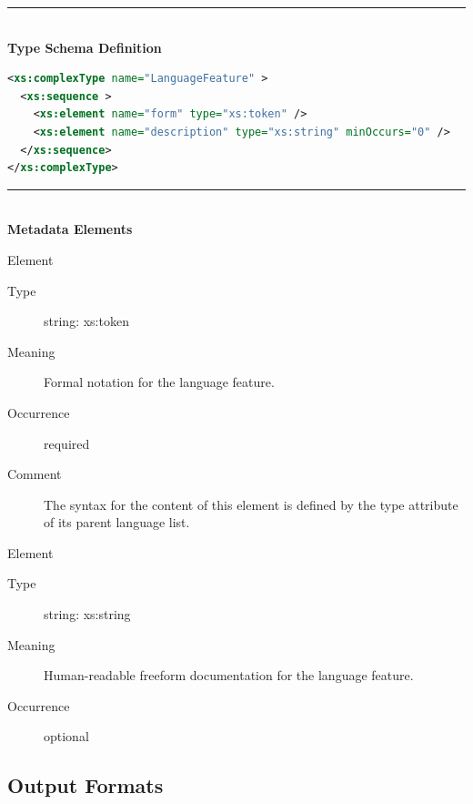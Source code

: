 \documentclass{ivoa}
\begin{document}

\noindent\rule[-2pt]{\textwidth}{0.5pt}\\
			\textbf{ Type Schema Definition}

\begin{lstlisting}[language=XML]
<xs:complexType name="LanguageFeature" >
  <xs:sequence >
    <xs:element name="form" type="xs:token" />
    <xs:element name="description" type="xs:string" minOccurs="0" />
  </xs:sequence>
</xs:complexType>
\end{lstlisting}

\noindent\rule[-2pt]{\textwidth}{0.5pt}\\
					\textbf{ Metadata Elements}

\begin{bigdescription}\item[Element \xmlel{form}]
\begin{description}
\item[Type\quad] string: xs:token
\item[Meaning\quad] 
          	Formal notation for the language feature.
        	
\item[Occurrence\quad] required
\item[Comment\quad] 
          	The syntax for the content of this element is defined by the
          	type attribute of its parent language list.
        	

\end{description}
\item[Element \xmlel{description}]
\begin{description}
\item[Type\quad] string: xs:string
\item[Meaning\quad] 
          	Human-readable freeform documentation for the language feature.
        	
\item[Occurrence\quad] optional

\end{description}


\end{bigdescription}



\subsection{Output Formats}
\end{document}
